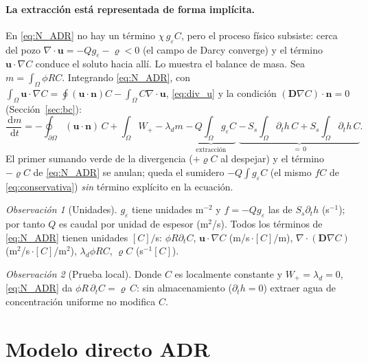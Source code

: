 \documentclass[11pt]{article}
\numberwithin{equation}{section}
\theoremstyle{remark}
\newtheorem*{remark}{Observación}
\newcommand{\bu}{\mathbf{u}}
\newcommand{\bD}{\mathbf{D}}
\newcommand{\bn}{\mathbf{n}}
\newcommand{\geps}{g_\varepsilon}
\newcommand{\vr}{\varrho}              %
\newcommand{\dd}{\,\mathrm{d}}
\begin{document}
\paragraph{La extracci\'on est\'a representada de forma impl\'icita.} En \eqref{eq:N_ADR} no hay un t\'ermino
$\chi\,\geps C$, pero el proceso f\'isico subsiste: cerca del pozo $\nabla\!\cdot\bu=-Q\geps-\vr<0$ (el campo de Darcy
converge) y el t\'ermino $\bu\cdot\nabla C$ conduce el soluto hacia all\'i. Lo muestra el balance de masa.
Sea $m=\int_\Omega\phi RC$. Integrando \eqref{eq:N_ADR}, con $\int_\Omega\bu\cdot\nabla C=\oint(\bu\cdot\bn)C-\int_\Omega C\nabla\!\cdot\bu$,
\eqref{eq:div_u} y la condici\'on $(\bD\nabla C)\cdot\bn=0$ (Secci\'on~\ref{sec:bc}):
\begin{equation}
\frac{\dd m}{\dd t}=-\oint_{\partial\Omega}(\bu\cdot\bn)\,C+\int_\Omega W_+-\lambda_dm\;\underbrace{-\,Q\!\int_\Omega\geps C}_{\text{extracci\'on}}\;
\underbrace{-\,S_s\!\int_\Omega\partial_th\,C+S_s\!\int_\Omega\partial_th\,C}_{=\,0}.
\label{eq:balance}
\end{equation}
El primer sumando verde de la divergencia ($+\vr C$ al despejar) y el t\'ermino $-\vr C$ de \eqref{eq:N_ADR} se anulan; queda el
sumidero $-Q\int\geps C$ (el mismo $fC$ de \eqref{eq:conservativa}) \emph{sin} t\'ermino expl\'icito en la ecuaci\'on.

\begin{remark}[Unidades]
$\geps$ tiene unidades m$^{-2}$ y $f=-Q\geps$ las de $S_s\partial_th$ (s$^{-1}$); por tanto $Q$ es caudal por unidad de espesor (m$^2$/s). Todos los t\'erminos
de \eqref{eq:N_ADR} tienen unidades $[C]/$s: $\phi R\partial_tC$, $\bu\cdot\nabla C$ (m/s\,$\cdot[C]$/m), $\nabla\!\cdot(\bD\nabla C)$ (m$^2$/s\,$\cdot[C]$/m$^2$),
$\lambda_d\phi RC$, $\vr C$ (s$^{-1}[C]$).
\end{remark}

\begin{remark}[Prueba local]
Donde $C$ es localmente constante y $W_+=\lambda_d=0$, \eqref{eq:N_ADR} da $\phi R\,\partial_tC=\vr\,C$: sin almacenamiento
($\partial_th=0$) extraer agua de concentraci\'on uniforme no modifica $C$.
\end{remark}

\section{Modelo directo ADR}
\label{sec:adr}
\end{document}
